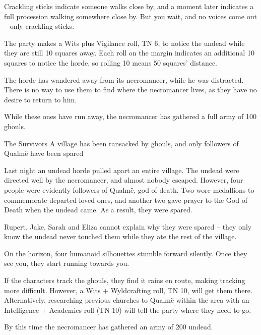 \begin{multicols}{2}
\begin{boxtext}

  Crackling sticks indicate someone walks close by, and a moment later indicates a full procession walking somewhere close by.
  But you wait, and no voices come out -- only crackling sticks.

\end{boxtext}

The party makes a Wits plus Vigilance roll, TN 6, to notice the undead while they are still 10 squares away.
Each roll on the margin indicates an additional 10 squares to notice the horde, so rolling 10 means 50 squares' distance.

The horde has wandered away from its necromancer, while he was distracted.
There is no way to use them to find where the necromancer lives, as they have no desire to return to him.

While these ones have run away, the necromancer has gathered a full army of 100 ghouls.

{The Survivors}%
{A village has been ransacked by ghouls, and only followers of Qualm\"{e} have been spared}%

Last night an undead horde pulled apart an entire village.  The undead were directed well by the necromancer, and almost nobody escaped.
However, four people were evidently followers of Qualm\"{e}, god of death.
Two wore medallions to commemorate departed loved ones, and another two gave prayer to the God of Death when the undead came.
As a result, they were spared.

Rupert, Jake, Sarah and Eliza cannot explain why they were spared -- they only know the undead never touched them while they ate the rest of the village.

\begin{boxtext}

  On the horizon, four humanoid silhouettes stumble forward silently.  Once they see you, they start running towards you.

\end{boxtext}

If the characters track the ghouls, they find it rains en route, making tracking more difficult.
However, a Wits + Wyldcrafting roll, TN 10, will get them there.
Alternatively, researching previous churches to Qualm\"{e} within the area with an Intelligence + Academics roll (TN 10) will tell the party where they need to go.

By this time the necromancer has gathered an army of 200 undead.


\end{multicols}
